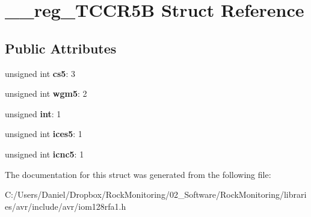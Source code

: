 \hypertarget{struct____reg___t_c_c_r5_b}{}\section{\+\_\+\+\_\+reg\+\_\+\+T\+C\+C\+R5B Struct Reference}
\label{struct____reg___t_c_c_r5_b}
\subsection*{Public Attributes}
\begin{DoxyCompactItemize}
\item 
unsigned int {\bfseries cs5}\+: 3\hypertarget{struct____reg___t_c_c_r5_b_a5410441e4257669649230c2667c8154e}{}\label{struct____reg___t_c_c_r5_b_a5410441e4257669649230c2667c8154e}

\item 
unsigned int {\bfseries wgm5}\+: 2\hypertarget{struct____reg___t_c_c_r5_b_a196fe3e53b23f7ac21873e9cd78f108c}{}\label{struct____reg___t_c_c_r5_b_a196fe3e53b23f7ac21873e9cd78f108c}

\item 
unsigned {\bfseries int}\+: 1\hypertarget{struct____reg___t_c_c_r5_b_acfef51943a11b7346784bac79fec09fa}{}\label{struct____reg___t_c_c_r5_b_acfef51943a11b7346784bac79fec09fa}

\item 
unsigned int {\bfseries ices5}\+: 1\hypertarget{struct____reg___t_c_c_r5_b_abed7928ee65936eb0a2c685e0a366dd1}{}\label{struct____reg___t_c_c_r5_b_abed7928ee65936eb0a2c685e0a366dd1}

\item 
unsigned int {\bfseries icnc5}\+: 1\hypertarget{struct____reg___t_c_c_r5_b_a423544c257cf7966320721ee0b3ab9b1}{}\label{struct____reg___t_c_c_r5_b_a423544c257cf7966320721ee0b3ab9b1}

\end{DoxyCompactItemize}


The documentation for this struct was generated from the following file\+:\begin{DoxyCompactItemize}
\item 
C\+:/\+Users/\+Daniel/\+Dropbox/\+Rock\+Monitoring/02\+\_\+\+Software/\+Rock\+Monitoring/libraries/avr/include/avr/iom128rfa1.\+h\end{DoxyCompactItemize}
